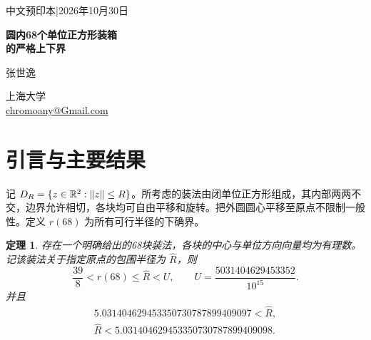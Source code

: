 \documentclass[11pt]{article}
\newtheorem{theorem}{定理}
\begin{document}
\thispagestyle{plain}
\begin{center}
{\small\sffamily\color{Muted} 中文预印本\quad |\quad 2026年10月30日\par}
\vspace{13pt}
{\fontsize{22}{30}\selectfont\bfseries\color{Ink}
圆内68个单位正方形装箱\\[2pt]
的严格上下界\par}
\vspace{14pt}
{\large 张世逸\par}
\vspace{4pt}
上海大学\\[2pt]
\href{mailto:chromoany@Gmail.com}{\small chromoany@Gmail.com}
\end{center}
\vspace{10pt}
\begin{abstract}
设 $r(68)$ 为容纳68个单位正方形的可行圆盘半径的下确界，正方形可任意旋转，内部两两不交。本文给出一个有理坐标构造，并利用计算机辅助排除证明
\[
\frac{39}{8}<r(68)<5.031404629453352.
\]
构造的包围半径由一个整数系数二次方程及宽度为 $10^{-30}$ 的隔离区间精确确定。下界采用定义在80个同心圆环上的非负径向权函数，通过对连续二维参数域的完整划分，以精确有理运算和外包区间验证单块积分不等式。随文提供完整坐标、权重、划分数据和验证程序。全局精确最优值以及半径为5时能否容纳68块，仍未确定。

\end{abstract}
\smallskip
{}

\section{引言与主要结果}
记 $D_R=\{z\in\mathbb R^2:\|z\|\le R\}$。所考虑的装法由闭单位正方形组成，其内部两两不交，边界允许相切，各块均可自由平移和旋转。把外圆圆心平移至原点不限制一般性。定义 $r(68)$ 为所有可行半径的下确界。

\begin{theorem}\label{thm:main}
存在一个明确给出的68块装法，各块的中心与单位方向向量均为有理数。记该装法关于指定原点的包围半径为 $\widehat R$，则
\begin{equation}\label{eq:bounds}
\frac{39}{8}<r(68)\le\widehat R<U,
\qquad U=\frac{5031404629453352}{10^{15}}.
\end{equation}
并且
\begin{equation}\label{eq:isolation}
\begin{gathered}
5.031404629453350730787899409097
<\widehat R,\\
\widehat R<5.031404629453350730787899409098.
\end{gathered}
\end{equation}
\end{theorem}
\end{document}
